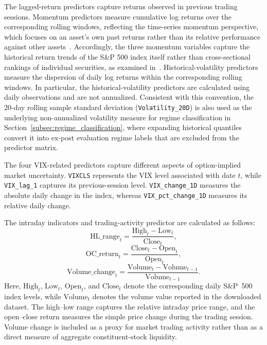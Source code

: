 \documentclass[runningheads,orivec]{llncs}
\begin{document}
The lagged-return predictors capture returns observed in previous trading sessions. Momentum predictors measure cumulative log returns over the corresponding rolling windows, reflecting the time-series momentum perspective, which focuses on an asset's own past returns rather than its relative performance against other assets~\cite{moskowitz2012}. Accordingly, the three momentum variables capture the historical return trends of the S\&P 500 index itself rather than cross-sectional rankings of individual securities, as examined in~\cite{jegadeesh1993}. Historical-volatility predictors measure the dispersion of daily log returns within the corresponding rolling windows. In particular, the historical-volatility predictors are calculated using daily observations and are not annualized. Consistent with this convention, the 20-day rolling sample standard deviation (\texttt{Volatility\_20D}) is also used as the underlying non-annualized volatility measure for regime classification in Section~\ref{subsec:regime_classification}, where expanding historical quantiles convert it into ex-post evaluation regime labels that are excluded from the predictor matrix.

The four VIX-related predictors capture different aspects of option-implied market uncertainty. \texttt{VIXCLS} represents the VIX level associated with date $t$, while \texttt{VIX\_lag\_1} captures its previous-session level. \texttt{VIX\_change\_1D} measures the absolute daily change in the index, whereas \texttt{VIX\_pct\_change\_1D} measures its relative daily change.

The intraday indicators and trading-activity predictor are calculated as follows:
\begin{equation}\label{eq:hl_range}
\text{HL\_range}_t = \frac{\text{High}_t - \text{Low}_t}{\text{Close}_t},
\end{equation}
\begin{equation}\label{eq:oc_return}
\text{OC\_return}_t = \frac{\text{Close}_t - \text{Open}_t}{\text{Open}_t},
\end{equation}
\begin{equation}\label{eq:volume_change}
\text{Volume\_change}_t = \frac{\text{Volume}_t - \text{Volume}_{t-1}}{\text{Volume}_{t-1}}.
\end{equation}
Here, $\text{High}_t$, $\text{Low}_t$, $\text{Open}_t$, and $\text{Close}_t$ denote the corresponding daily S\&P~500 index levels, while $\text{Volume}_t$ denotes the volume value reported in the downloaded dataset. The high--low range captures the relative intraday price range, and the open--close return measures the simple price change during the trading session. Volume change is included as a proxy for market trading activity rather than as a direct measure of aggregate constituent-stock liquidity.
\end{document}
